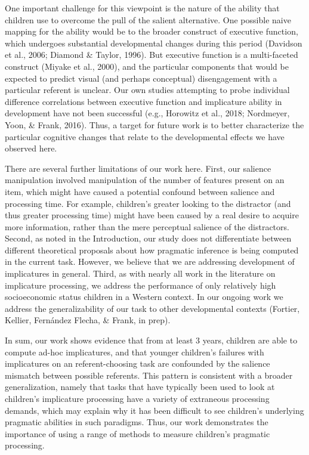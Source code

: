 \documentclass[man]{apa6}
\theoremstyle{definition}
\theoremstyle{definition}
\theoremstyle{definition}
\theoremstyle{remark}
\begin{document}
One important challenge for this viewpoint is the nature of the ability
that children use to overcome the pull of the salient alternative. One
possible naive mapping for the ability would be to the broader construct
of executive function, which undergoes substantial developmental changes
during this period (Davidson et al., 2006; Diamond \& Taylor, 1996). But
executive function is a multi-faceted construct (Miyake et al., 2000),
and the particular components that would be expected to predict visual
(and perhaps conceptual) disengagement with a particular referent is
unclear. Our own studies attempting to probe individual difference
correlations between executive function and implicature ability in
development have not been successful (e.g., Horowitz et al., 2018;
Nordmeyer, Yoon, \& Frank, 2016). Thus, a target for future work is to
better characterize the particular cognitive changes that relate to the
developmental effects we have observed here.

There are several further limitations of our work here. First, our
salience manipulation involved manipulation of the number of features
present on an item, which might have caused a potential confound between
salience and processing time. For example, children's greater looking to
the distractor (and thus greater processing time) might have been caused
by a real desire to acquire more information, rather than the mere
perceptual salience of the distractors. Second, as noted in the
Introduction, our study does not differentiate between different
theoretical proposals about how pragmatic inference is being computed in
the current task. However, we believe that we are addressing development
of implicatures in general. Third, as with nearly all work in the
literature on implicature processing, we address the performance of only
relatively high socioeconomic status children in a Western context. In
our ongoing work we address the generalizability of our task to other
developmental contexts (Fortier, Kellier, Fernández Flecha, \& Frank, in
prep).

In sum, our work shows evidence that from at least 3 years, children are
able to compute ad-hoc implicatures, and that younger children's
failures with implicatures on an referent-choosing task are confounded
by the salience mismatch between possible referents. This pattern is
consistent with a broader generalization, namely that tasks that have
typically been used to look at children's implicature processing have a
variety of extraneous processing demands, which may explain why it has
been difficult to see children's underlying pragmatic abilities in such
paradigms. Thus, our work demonstrates the importance of using a range
of methods to measure children's pragmatic processing.
\end{document}
